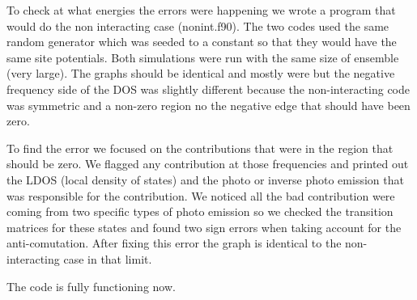 \documentclass{article}
\begin{document}
To check at what energies the errors were happening we wrote a program that would do the non interacting case (nonint.f90). The two codes used the same random generator which was seeded to a constant so that they would have the same site potentials. Both simulations were run with the same size of ensemble (very large). The graphs should be identical and mostly were but the negative frequency side of the DOS was slightly different because the non-interacting code was symmetric and a non-zero region no the negative edge that should have been zero.

To find the error we focused on the contributions that were in the region that should be zero. We flagged any contribution at those frequencies and printed out the LDOS (local density of states) and the photo or inverse photo emission that was responsible for the contribution. We noticed all the bad contribution were coming from two specific types of photo emission so we checked the transition matrices for these states and found two sign errors when taking account for the anti-comutation. After fixing this error the graph is identical to the non-interacting case in that limit.

The code is fully functioning now.
\end{document}
